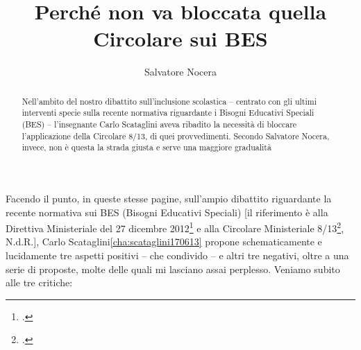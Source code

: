 \author{Salvatore Nocera}
\title{Perché non va bloccata quella Circolare sui BES}
\label{cha:nocera180613}
\begin{abstract}
Nell'ambito del nostro dibattito sull'inclusione scolastica – centrato con gli ultimi interventi specie sulla recente normativa riguardante i Bisogni Educativi Speciali (BES) – l'insegnante Carlo Scataglini aveva ribadito la necessità di bloccare l'applicazione della Circolare 8/13,  di quei provvedimenti. Secondo Salvatore Nocera, invece, non è questa la strada giusta e serve una maggiore gradualità
\end{abstract}
\maketitle
Facendo il punto, in queste stesse pagine, sull'ampio dibattito riguardante la recente normativa sui BES (Bisogni Educativi Speciali) [il riferimento è alla Direttiva Ministeriale del 27 dicembre 2012\footcite{dir27Dic2012} e alla Circolare Ministeriale 8/13\footcite{cm8_2013}, N.d.R.], Carlo Scataglini\ref{cha:scataglini170613} propone schematicamente e lucidamente tre aspetti positivi – che condivido – e altri tre negativi, oltre a una serie di proposte, molte delle quali mi lasciano assai perplesso.
Veniamo subito alle tre critiche:
